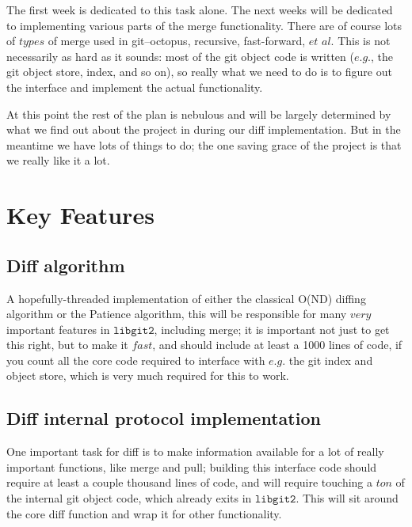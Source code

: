 \documentclass[a4paper]{article}
\begin{document}
The first week is dedicated to this task alone. The next weeks will be dedicated to implementing various parts of the merge functionality. There are of course lots of $\textit{types}$ of merge used in git--octopus, recursive, fast-forward, $\textit{et al}$. This is not necessarily as hard as it sounds: most of the git object code is written ($\textit{e.g.}$, the git object store, index, and so on), so really what we need to do is to figure out the interface and implement the actual functionality.

At this point the rest of the plan is nebulous and will be largely determined by what we find out about the project in during our diff implementation. But in the meantime we have lots of things to do; the one saving grace of the project is that we really like it a lot.

\pagebreak

\section{Key Features}

\subsection{Diff algorithm}

A hopefully-threaded implementation of either the classical O(ND) diffing algorithm or the Patience algorithm, this will be responsible for many $\textit{very}$ important features in $\texttt{libgit2}$, including merge; it is important not just to get this right, but to make it $\textit{fast}$, and should include at least a 1000 lines of code, if you count all the core code required to interface with $\textit{e.g.}$ the git index and object store, which is very much required for this to work.

\subsection{Diff internal protocol implementation}

One important task for diff is to make information available for a lot of really important functions, like merge and pull; building this interface code should require at least a couple thousand lines of code, and will require touching a $\textit{ton}$ of the internal git object code, which already exits in $\texttt{libgit2}$. This will sit around the core diff function and wrap it for other functionality.
\end{document}
